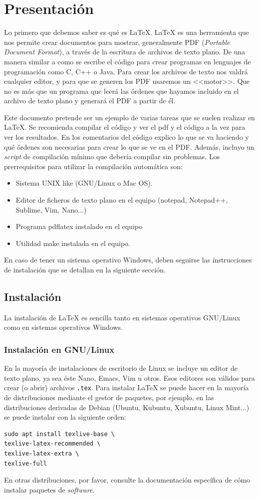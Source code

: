 \documentclass[a4paper]{article}
\begin{document}
\section{Presentación}
Lo primero que debemos saber es qué es \LaTeX{}. \LaTeX{} es una herramienta
que nos permite crear documentos para mostrar, generalmente PDF
(\textit{Portable Document Format}), a través de la escritura de archivos de
texto plano. De una manera similar a como se escribe el código para crear
programas en lenguajes de programación como C, C++ o Java. Para crear los
archivos de texto nos valdrá cualquier editor, y para que se generen los PDF
usaremos un <<motor>>. Que no es más que un programa que leerá las órdenes
que hayamos incluido en el archivo de texto plano y generará el PDF a partir de
él.

Este documento pretende ser un ejemplo de varias tareas que se suelen realizar
en \LaTeX{}. Se recomienda compilar el código y ver el pdf y el código a la
vez para ver los resultados. En los comentarios del código explico lo que se va
haciendo y qué órdenes son necesarias para crear lo que se ve en el PDF.
Además, incluyo un \textit{script} de compilación mínimo que debería compilar
sin problemas. Los prerrequisitos para utilizar la compilación automática son:

\begin{itemize}
    \item Sistema UNIX like (GNU/Linux o Mac OS).
    \item Editor de ficheros de texto plano en el equipo (notepad, Notepad++,
        Sublime, Vim, Nano...)
    \item Programa pdflatex instalado en el equipo
    \item Utilidad make instalada en el equipo.
\end{itemize}

En caso de tener un sistema operativo Windows, deben seguirse las instrucciones
de instalación que se detallan en la siguiente sección.
\subsection{Instalación}
La instalación de \LaTeX{} es sencilla tanto en sistemas operativos GNU/Linux
como en sistemas operativos Windows.
\subsubsection{Instalación en GNU/Linux}\label{instGNULinux}
En la mayoría de instalaciones de escritorio de Linux se incluye un editor de
texto plano, ya sea éste Nano, Emacs, Vim u otros. Esos editores son válidos
para crear (o abrir) archivos \texttt{.tex}. Para instalar \LaTeX{} se puede
hacer en la mayoría de distribuciones mediante el gestor de paquetes, por
ejemplo, en las distribuciones derivadas de Debian (Ubuntu, Kubuntu, Xubuntu,
Linux Mint...) se puede instalar con la siguiente orden:
\begin{verbatim}
sudo apt install texlive-base \
texlive-latex-recommended \
texlive-latex-extra \
texlive-full
\end{verbatim} 
En otras distribuciones, 
por favor, consulte la documentación específica de cómo instalar paquetes de
\textit{software}.
\end{document}
